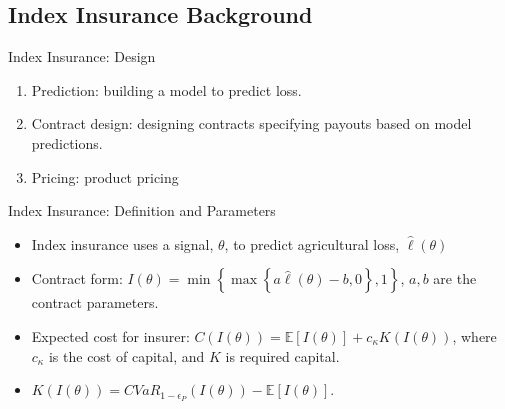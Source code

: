 \documentclass{beamer}
\begin{document}
  
\subsection{Index Insurance Background}

\begin{frame}{Index Insurance: Design}
\begin{enumerate}
    \setlength\itemsep{1em}
    \item Prediction: building a model to predict loss. 
    \item Contract design: designing contracts specifying payouts based on model predictions.
    \item Pricing: product pricing
\end{enumerate}
\end{frame} 

\begin{frame}{Index Insurance: Definition and Parameters}
\begin{itemize}
    \setlength\itemsep{1em}
    \item Index insurance uses a signal, $\theta$, to predict agricultural loss, $\hat{\ell}(\theta)$
    \item Contract form: $I(\theta) = \min \left \{ \max \left \{a\hat{\ell}(\theta) - b,0 \right \}, 1 \right \}$, $a,b$ are the contract parameters.
    \item Expected cost for insurer: $C(I(\theta)) = \mathbb{E}[I(\theta)] + c_{\kappa} K(I(\theta))$, where $c_{\kappa}$ is the cost of capital, and $K$ is required capital.
    \item $K(I(\theta)) = CVaR_{1-\epsilon_P}\left ( I(\theta) \right ) - \mathbb{E}[I(\theta)]$.
\end{itemize}
\end{frame}
\end{document}
